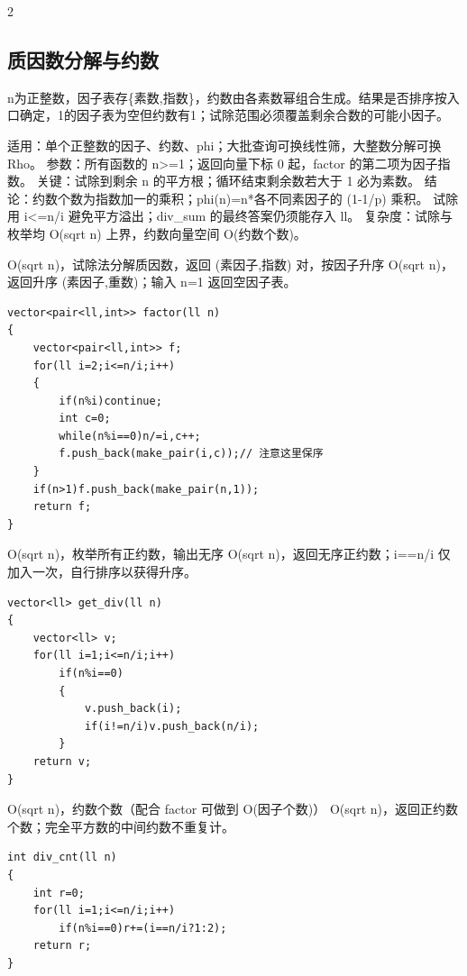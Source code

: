 \documentclass[UTF8,fontset=fandol,a4paper,twoside]{ctexart}
\newcommand{\note}[1]{{\fontsize{10}{12}\selectfont #1\par}}
\begin{document}
\begin{multicols}{2}
\subsection{质因数分解与约数}

\note{n为正整数，因子表存\{素数,\allowbreak{}指数\}，约数由各素数幂组合生成。结果是否排序按入口确定，1的因子表为空但约数有1；试除范围必须覆盖剩余合数的可能小因子。}
\note{适用：单个正整数的因子、约数、phi；大批查询可换线性筛，大整数分解可换 Rho。 参数：所有函数的 n>\allowbreak{}=\allowbreak{}1；返回向量下标 0 起，factor 的第二项为因子指数。 关键：试除到剩余 n 的平方根；循环结束剩余数若大于 1 必为素数。 结论：约数个数为指数加一的乘积；phi(\allowbreak{}n)\allowbreak{}=\allowbreak{}n*各不同素因子的 (\allowbreak{}1-\allowbreak{}1/\allowbreak{}p)\allowbreak{} 乘积。 试除用 i<\allowbreak{}=\allowbreak{}n/\allowbreak{}i 避免平方溢出；div\_sum 的最终答案仍须能存入 ll。 复杂度：试除与枚举均 O(\allowbreak{}sqrt n)\allowbreak{} 上界，约数向量空间 O(\allowbreak{}约数个数)\allowbreak{}。}
\note{O(\allowbreak{}sqrt n)\allowbreak{}，试除法分解质因数，返回 (\allowbreak{}素因子,\allowbreak{}指数)\allowbreak{} 对，按因子升序 O(\allowbreak{}sqrt n)\allowbreak{}，返回升序 (\allowbreak{}素因子,\allowbreak{}重数)\allowbreak{}；输入 n=\allowbreak{}1 返回空因子表。}
\begin{lstlisting}
vector<pair<ll,int>> factor(ll n)
{
    vector<pair<ll,int>> f;
    for(ll i=2;i<=n/i;i++)
    {
        if(n%i)continue;
        int c=0;
        while(n%i==0)n/=i,c++;
        f.push_back(make_pair(i,c));// 注意这里保序
    }
    if(n>1)f.push_back(make_pair(n,1));
    return f;
}
\end{lstlisting}
\note{O(\allowbreak{}sqrt n)\allowbreak{}，枚举所有正约数，输出无序 O(\allowbreak{}sqrt n)\allowbreak{}，返回无序正约数；i=\allowbreak{}=\allowbreak{}n/\allowbreak{}i 仅加入一次，自行排序以获得升序。}
\begin{lstlisting}
vector<ll> get_div(ll n)
{
    vector<ll> v;
    for(ll i=1;i<=n/i;i++)
        if(n%i==0)
        {
            v.push_back(i);
            if(i!=n/i)v.push_back(n/i);
        }
    return v;
}
\end{lstlisting}
\note{O(\allowbreak{}sqrt n)\allowbreak{}，约数个数（配合 factor 可做到 O(\allowbreak{}因子个数)\allowbreak{}） O(\allowbreak{}sqrt n)\allowbreak{}，返回正约数个数；完全平方数的中间约数不重复计。}
\begin{lstlisting}
int div_cnt(ll n)
{
    int r=0;
    for(ll i=1;i<=n/i;i++)
        if(n%i==0)r+=(i==n/i?1:2);
    return r;
}
\end{lstlisting}

\end{multicols}
\end{document}
